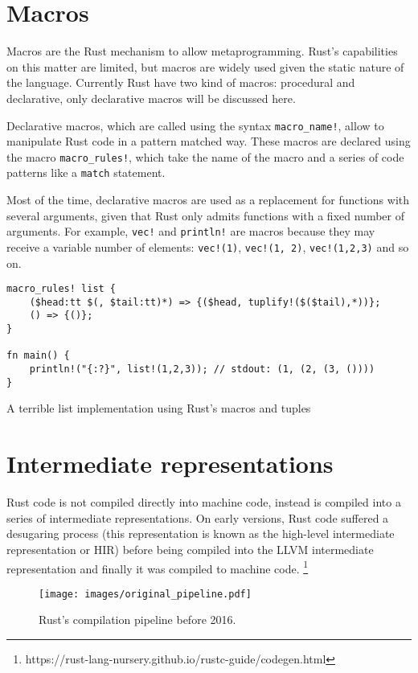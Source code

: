 \section{Macros}
Macros are the Rust mechanism to allow metaprogramming. Rust's capabilities on this matter are limited, but macros are widely used given the static nature of the language. Currently Rust have two kind of macros: procedural and declarative, only declarative macros will be discussed here.

Declarative macros, which are called using the syntax \texttt{macro\_name!}, allow to manipulate Rust code in a pattern matched way. These macros are declared using the macro \texttt{macro\_rules!}, which take the name of the macro and a series of code patterns like a \texttt{match} statement. 

Most of the time, declarative macros are used as a replacement for functions with several arguments, given that Rust only admits functions with a fixed number of arguments. For example, \texttt{vec!} and \texttt{println!} are macros because they may receive a variable number of elements: \texttt{vec!(1)},  \texttt{vec!(1, 2)},  \texttt{vec!(1,2,3)} and so on.


\begin{listing}[h]
	\begin{verbatim}
macro_rules! list {
    ($head:tt $(, $tail:tt)*) => {($head, tuplify!($($tail),*))};
    () => {()};
}

fn main() {
    println!("{:?}", list!(1,2,3)); // stdout: (1, (2, (3, ())))
}
    \end{verbatim}
  \caption{A terrible list implementation using Rust's macros and tuples}
  \label{lst:unrecoverable_error}
\end{listing}
\section{Intermediate representations}
Rust code is not compiled directly into machine code, instead is compiled into a series of intermediate representations. On early versions, Rust code suffered a desugaring process (this representation is known as the high-level intermediate representation or HIR) before being compiled into the LLVM intermediate representation and finally it was compiled to machine code. \footnote{https://rust-lang-nursery.github.io/rustc-guide/codegen.html}

\begin{figure}[h]
  \centering
  \texttt{[image: images/original\_pipeline.pdf]}
  \caption{Rust's compilation pipeline before 2016.}
\end{figure}

